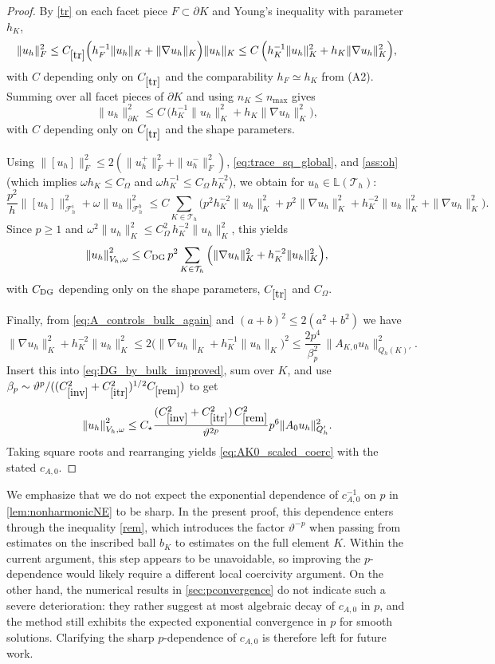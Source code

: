 \documentclass[11pt]{article}
\theoremstyle{definition}
\theoremstyle{plain}
\newcommand{\const}[1]{C_{\eqref{#1}}}
\newcommand{\dgonorm}[1]{\norm{#1}_{V_h,\omega}}
\newcommand{\Th}{{\calT_h}}
\newcommand{\Fhi}{{\calF_h^i}}
\newcommand{\Fhb}{{\calF_h^b}}
\newcommand{\Lh}{\mathbb{L}(\Th)}
\newcommand{\QKh}{Q_h(K)}
\newcommand{\Qh}{Q_h}
\newcommand*{\norm}[1]{\left\|#1\right\|}
\newcommand{\calF}{\mathcal{F}}
\newcommand{\calT}{\mathcal{T}}
\begin{document}
\begin{proof}
By \eqref{tr} on each facet piece $F\subset\partial K$ and Young's inequality with parameter $h_K$,
\[
\|u_h\|_{F}^2
\le \const{tr}\Big(h_F^{-1}\|u_h\|_{K} + \|\nabla u_h\|_{K}\Big)\|u_h\|_{K}
\le C\,\Big(h_K^{-1}\|u_h\|_K^2 + h_K\|\nabla u_h\|_K^2\Big),
\]
with $C$ depending only on $\const{tr}$ and the comparability $h_F\simeq h_K$ from \textup{(A2)}.
Summing over all facet pieces of $\partial K$ and using $n_K\le n_{\max}$ gives
\begin{equation}\label{eq:trace_sq_global}
\|u_h\|_{\partial K}^2 \le C\,\Big(h_K^{-1}\|u_h\|_K^2 + h_K\|\nabla u_h\|_K^2\Big),
\end{equation}
with $C$ depending only on $\const{tr}$ and the shape parameters.

Using $\|[u_h]\|_F^2\le 2(\|u_h^+\|_F^2+\|u_h^-\|_F^2)$, \eqref{eq:trace_sq_global}, and \eqref{ass:oh}
(which implies $\omega h_K\le C_\Omega$ and $\omega h_K^{-1}\le C_\Omega\,h_K^{-2}$), we obtain for $u_h\in\Lh$:
\[
\frac{p^2}{h}\|[u_h]\|_{\Fhi}^2 + \omega\|u_h\|_{\Fhb}^2
\le C\sum_{K\in\Th}\Big(
p^2 h_K^{-2}\|u_h\|_K^2 + p^2\|\nabla u_h\|_K^2
+ h_K^{-2}\|u_h\|_K^2 + \|\nabla u_h\|_K^2
\Big).
\]
Since $p\ge 1$ and $\omega^2\|u_h\|_K^2\le C_\Omega^2\,h_K^{-2}\|u_h\|_K^2$, this yields
\begin{equation}\label{eq:DG_by_bulk_improved}
\dgonorm{u_h}^2
\le C_{\rm DG}\,p^2 \sum_{K\in\Th}\Big(\|\nabla u_h\|_K^2 + h_K^{-2}\|u_h\|_K^2\Big),
\end{equation}
with $C_{\rm DG}$ depending only on the shape parameters, $\const{tr}$ and $C_\Omega$.

Finally, from \eqref{eq:A_controls_bulk_again} and $(a+b)^2\le 2(a^2+b^2)$ we have
\[
\|\nabla u_h\|_K^2 + h_K^{-2}\|u_h\|_K^2
\le 2\Big(\|\nabla u_h\|_K + h_K^{-1}\|u_h\|_K\Big)^2
\le \frac{2p^4}{\beta_p^2}\,\|A_{K,0}u_h\|_{\QKh'}^2.
\]
Insert this into \eqref{eq:DG_by_bulk_improved}, sum over $K$, and use $\beta_p\sim \vartheta^{p}/((\const{inv}^2+\const{itr}^2)^{1/2}\const{rem})$
to get
\[
\dgonorm{u_h}^2 \le C_\star
\frac{(\const{inv}^2+\const{itr}^2)\,\const{rem}^2}{\vartheta^{2p}}
p^{6}
\|A_0u_h\|_{\Qh'}^2.
\]
Taking square roots and rearranging yields \eqref{eq:AK0_scaled_coerc} with the stated $c_{A,0}$.
\end{proof}

We emphasize that we do not expect the exponential dependence of $c_{A,0}^{-1}$ on $p$ in \cref{lem:nonharmonicNE} to be sharp.
In the present proof, this dependence enters through the inequality \eqref{rem}, which introduces the factor $\vartheta^{-p}$ when passing from estimates on the inscribed ball $b_K$ to estimates on the full element $K$.
Within the current argument, this step appears to be unavoidable, so improving the $p$-dependence would likely require a different local coercivity argument.
On the other hand, the numerical results in \cref{sec:pconvergence} do not indicate such a severe deterioration: they rather suggest at most algebraic decay of $c_{A,0}$ in $p$, and the method still exhibits the expected exponential convergence in $p$ for smooth solutions.
Clarifying the sharp $p$-dependence of $c_{A,0}$ is therefore left for future work.
\end{document}
